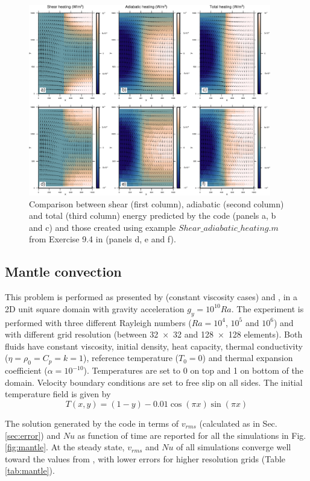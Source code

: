 \documentclass[hidelinks,11pt,a4paper]{article}
\begin{document}
\begin{figure}
\centering
\noindent\includegraphics[width=400px]{./Figures/Energy.pdf}
\caption{Comparison between shear (first column), adiabatic (second column) and total (third column) energy predicted by the code (panels a, b and c) and those created using example ${Shear\_adiabatic\_heating.m}$ from Exercise 9.4 in \citet{Gerya2010b} (panels d, e and f).}
\label{fig:energy}
\end{figure}

\subsection{Mantle convection}\label{sec:mantle}
This problem is performed as presented by \citet{Blankenbach1989} (constant viscosity cases) and \citet{Thieulot2014}, in a 2D unit square domain with gravity acceleration $g_y=10^{10}Ra$. The experiment is performed with three different Rayleigh numbers ($Ra=10^4$, $10^5$ and $10^6$) and with different grid resolution (between \num{32x32} and \num{128x128} elements). Both fluids have constant viscosity, initial density, heat capacity, thermal conductivity ($\eta= \rho_0= C_p = k=1$), reference temperature ($T_0=0$) and thermal expansion coefficient ($\alpha=10^{-10}$). Temperatures are set to 0 on top and 1 on bottom of the domain. Velocity boundary conditions are set to free slip on all sides. The initial temperature field is given by \[T(x,y)=(1-y)-0.01 \cos (\pi x) \sin (\pi x)\]

The solution generated by the code in terms of $v_{rms}$ (calculated as in Sec. \ref{sec:error}) and $Nu$ as function of time are reported for all the simulations in Fig. \ref{fig:mantle}. At the steady state, $v_{rms}$ and $Nu$ of all simulations converge well toward the values from \citet{Blankenbach1989}, with lower errors for higher resolution grids (Table \ref{tab:mantle}).
\end{document}
